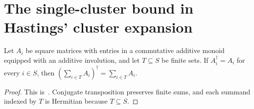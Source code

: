 \section{The single-cluster bound in Hastings' cluster expansion}
\label{sec:hastings_single_cluster_bound}

\begin{lemma}
    \label{thm:hermitian_partial_sums}
    \leanok
    Let $A_i$ be square matrices with entries in a commutative additive monoid
    equipped with an additive involution, and let $T\subseteq S$ be finite sets.
    If $A_i^\dagger=A_i$ for every $i\in S$, then
    $(\sum_{i\in T}A_i)^\dagger=\sum_{i\in T}A_i$.
\end{lemma}
\begin{proof}\leanok
    This is~\cite[``Hermitian partial sums'']{QICLean2026Blueprint}.
    Conjugate transposition preserves finite sums, and each summand indexed by
    $T$ is Hermitian because $T\subseteq S$.
\end{proof}

